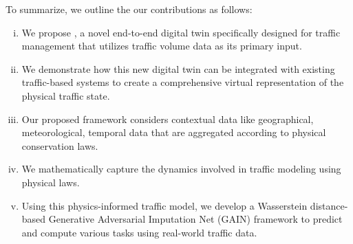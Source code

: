 To summarize, we outline the our contributions as follows:

\begin{enumerate}[(i)]
\item We propose \name, a novel end-to-end digital twin specifically designed for traffic management that utilizes traffic volume data as its primary input.
\item We demonstrate how this new digital twin can be integrated with existing traffic-based systems to create a comprehensive virtual representation of the physical traffic state.
\item Our proposed framework considers contextual data like geographical, meteorological, temporal data that are aggregated according to physical conservation laws.
\item We mathematically capture the dynamics involved in traffic modeling using physical laws.
\item Using this physics-informed traffic model, we develop a Wasserstein distance-based Generative Adversarial Imputation Net (GAIN) framework to predict and compute various tasks using real-world traffic data.
\end{enumerate}

